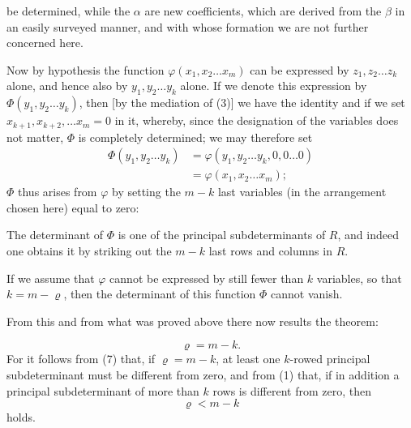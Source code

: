 
be determined, while the $\alpha$ are new coefficients, which are derived
from the $\beta$ in an easily surveyed manner, and with whose
formation we are not further concerned here.

Now by hypothesis the function
$\varphi(x_1, x_2 \ldots x_m)$ can be expressed by $z_1, z_2 \ldots z_k$ alone, and hence also by $y_1, y_2 \ldots y_k$
alone. If we denote this expression by
$\Phi(y_1, y_2 \ldots y_k)$, then [by the mediation of (3)] we have the
identity
and if we set $x_{k+1}, x_{k+2}, \ldots x_m = 0$ in it,
whereby, since the designation of the variables does not matter,
$\Phi$ is completely determined; we may therefore set
\begin{align}
\Phi(y_1, y_2 \ldots y_k) &= \varphi(y_1, y_2 \ldots y_k, 0, 0 \ldots 0) \tag{6}\\
&= \varphi(x_1, x_2 \ldots x_m);
\end{align}
$\Phi$ thus arises from $\varphi$ by setting the $m-k$ last
variables (in the arrangement chosen here) equal to zero:

The determinant of $\Phi$ is one of the principal subdeterminants of $R$, and indeed one obtains it by striking out the
$m-k$ last rows and columns in $R$.

If we assume that $\varphi$ cannot be expressed by still fewer than
$k$ variables, so that $k = m - \varrho$, then
the determinant of this function $\Phi$ cannot vanish.

From this and from what was proved above there now results
the theorem:

 
\[
\varrho = m - k.
\]
For it follows from (7) that, if $\varrho = m - k$, at least
one $k$-rowed principal subdeterminant must be different from
zero, and from (1) that, if in addition a principal subdeterminant of more than $k$ rows is different from zero, then
\[
\varrho < m - k
\]
holds.
